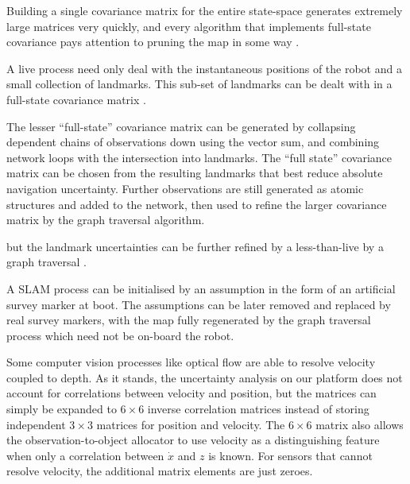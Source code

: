 \documentclass{article}
\begin{document}
    Building a single covariance matrix for the entire state-space generates extremely large matrices very quickly, and every algorithm that implements full-state covariance pays attention to pruning the map in some way\cite{monoslam} \cite{airshipSLAM}.
    
    A live process need only deal with the instantaneous positions of the robot and a small collection of landmarks. This sub-set of landmarks can be dealt with in a full-state covariance matrix \cite{monoslam}.  
    
    The lesser ``full-state'' covariance matrix can be generated by collapsing dependent chains of observations down using the vector sum, and combining network loops with the intersection into landmarks.  The ``full state'' covariance matrix can be chosen from the resulting landmarks that best reduce absolute navigation uncertainty.  Further observations are still generated as atomic structures and added to the network, then used to refine the larger covariance matrix by the graph traversal algorithm.  



    but the landmark uncertainties can be further refined by a less-than-live by a graph traversal \cite{SLAMgraph}.











    A SLAM process can be initialised by an assumption in the form of an artificial survey marker at boot. The assumptions can be later removed and replaced by real survey markers, with the map fully regenerated by the graph traversal process which need not be on-board the robot.
    
    Some computer vision processes like optical flow are able to resolve velocity coupled to depth.
    As it stands, the uncertainty analysis on our platform does not account for correlations between velocity and position, but the matrices can simply be expanded to \(6\times6\) inverse correlation matrices instead of storing independent \(3\times3\) matrices for position and velocity.  The \(6\times6\) matrix also allows the observation-to-object allocator to use velocity as a distinguishing feature when only a correlation between \(\dot{x}\) and \(z\) is known.  For sensors that cannot resolve velocity, the additional matrix elements are just zeroes.
\end{document}
